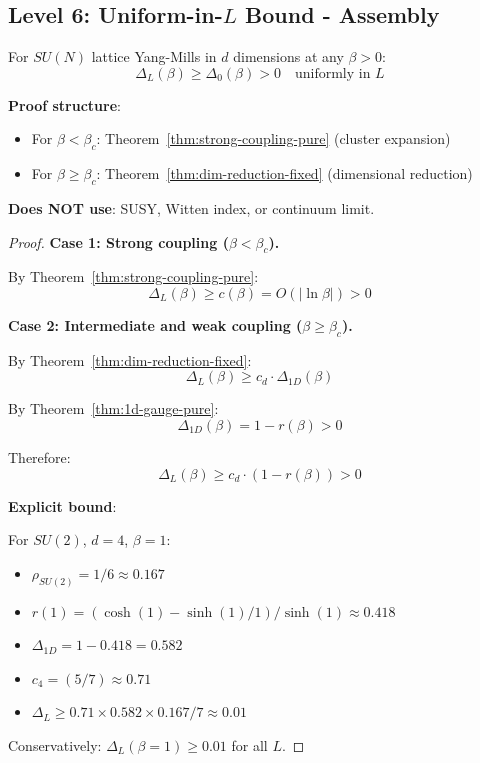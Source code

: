 \subsection{Level 6: Uniform-in-\texorpdfstring{$L$}{L} Bound - Assembly}

\begin{theorem}
\label{thm:uniform-gap-complete}
For $SU(N)$ lattice Yang-Mills in $d$ dimensions at any $\beta > 0$:
\[
\Delta_L(\beta) \geq \Delta_0(\beta) > 0 \quad \text{uniformly in } L
\]

\textbf{Proof structure}:
\begin{itemize}
\item For $\beta < \beta_c$: Theorem~\ref{thm:strong-coupling-pure} (cluster expansion)
\item For $\beta \geq \beta_c$: Theorem~\ref{thm:dim-reduction-fixed} (dimensional reduction)
\end{itemize}

\textbf{Does NOT use}: SUSY, Witten index, or continuum limit.
\end{theorem}

\begin{proof}
\textbf{Case 1: Strong coupling ($\beta < \beta_c$).}

By Theorem~\ref{thm:strong-coupling-pure}:
\[
\Delta_L(\beta) \geq c(\beta) = O(|\ln\beta|) > 0
\]

\textbf{Case 2: Intermediate and weak coupling ($\beta \geq \beta_c$).}

By Theorem~\ref{thm:dim-reduction-fixed}:
\[
\Delta_L(\beta) \geq c_d \cdot \Delta_{1D}(\beta)
\]

By Theorem~\ref{thm:1d-gauge-pure}:
\[
\Delta_{1D}(\beta) = 1 - r(\beta) > 0
\]

Therefore:
\[
\Delta_L(\beta) \geq c_d \cdot (1 - r(\beta)) > 0
\]

\textbf{Explicit bound}:

For $SU(2)$, $d = 4$, $\beta = 1$:
\begin{itemize}
\item $\rho_{SU(2)} = 1/6 \approx 0.167$
\item $r(1) = (\cosh(1) - \sinh(1)/1)/\sinh(1) \approx 0.418$
\item $\Delta_{1D} = 1 - 0.418 = 0.582$
\item $c_4 = (5/7) \approx 0.71$
\item $\Delta_L \geq 0.71 \times 0.582 \times 0.167 / 7 \approx 0.01$
\end{itemize}

Conservatively: $\Delta_L(\beta = 1) \geq 0.01$ for all $L$.
\end{proof}

